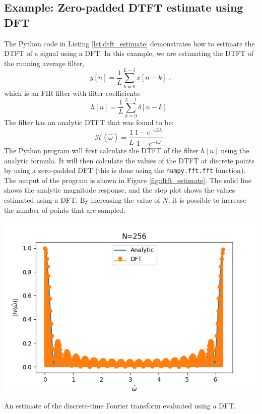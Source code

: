 \subsection{Example: Zero-padded DTFT estimate using DFT}

The Python code in Listing \ref{lst:dtft_estimate} demonstrates how to
estimate the DTFT of a signal using a DFT. In this example, we are
estimating the DTFT of the running average filter,
\begin{equation}
  y[n]=\frac{1}{L}\sum_{k=0}^{L-1}x[n-k] \,\,,
\end{equation}
which is an FIR filter with filter coefficients:
\begin{equation}
  h[n] = \frac{1}{L}\sum_{k=0}^{L-1}\delta[n-k] \,\, _.
\end{equation}
The filter has an analytic DTFT that was found to be:
\begin{equation}
  \mathcal{H}(\hat{\omega}) = \frac{1}{L}\frac{1-e^{-i\hat{\omega}L}}{1-e^{-i\hat{\omega}}} \,\, _.
\end{equation}
The Python program will first calculate the DTFT of the filter $h[n]$
using the analytic formula. It will then calculate the values of the
DTFT at discrete points by using a zero-padded DFT (this is done using
the \verb|numpy.fft.fft| function). The output of the program is shown
in Figure \ref{fig:dtft_estimate}. The solid line shows the analytic
magnitude response, and the step plot shows the values estimated using
a DFT. By increasing the value of $N$, it is possible to increase the
number of points that are sampled.
\begin{marginfigure}
  \begin{center}
    \includegraphics[width=1.5\textwidth]{code/020_dtft_estimate/dtft_estimate.png}
  \end{center}
  \caption{An estimate of the discrete-time Fourier transform evaluated using a DFT.}
  \label{fig:dtft_estimate}
\end{marginfigure}

